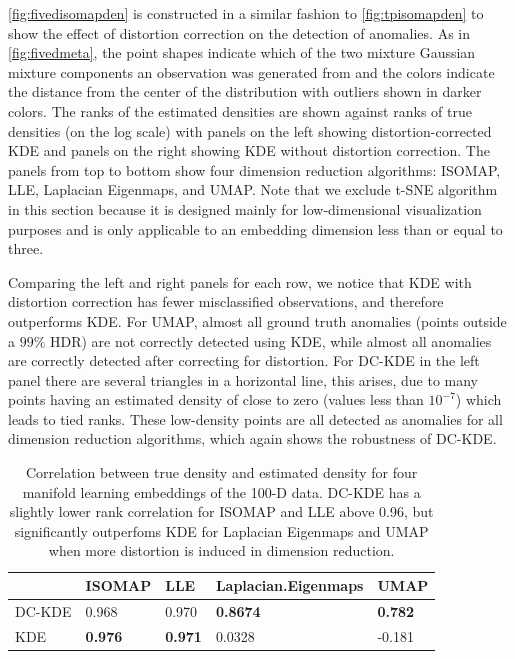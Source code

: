 \documentclass[12pt]{article}
\begin{document}
\autoref{fig:fivedisomapden} is constructed in a similar fashion to \autoref{fig:tpisomapden} to show the effect of distortion correction on the detection of anomalies. As in \autoref{fig:fivedmeta}, the point shapes indicate which of the two mixture Gaussian mixture components an observation was generated from and the colors indicate the distance from the center of the distribution with outliers shown in darker colors. The ranks of the estimated densities are shown against ranks of true densities (on the log scale) with panels on the left showing distortion-corrected KDE and panels on the right showing KDE without distortion correction. The panels from top to bottom show four dimension reduction algorithms: ISOMAP, LLE, Laplacian Eigenmaps, and UMAP. Note that we exclude t-SNE algorithm in this section because it is designed mainly for low-dimensional visualization purposes and is only applicable to an embedding dimension less than or equal to three.

Comparing the left and right panels for each row, we notice that KDE with distortion correction has fewer misclassified observations, and therefore outperforms KDE. For UMAP, almost all ground truth anomalies (points outside a \(99\%\) HDR) are not correctly detected using KDE, while almost all anomalies are correctly detected after correcting for distortion. For DC-KDE in the left panel there are several triangles in a horizontal line, this arises, due to many points having an estimated density of close to zero (values less than \(10^{-7}\)) which leads to tied ranks. These low-density points are all detected as anomalies for all dimension reduction algorithms, which again shows the robustness of DC-KDE.

\begin{table}

\caption{\label{tab:fivedcors}Correlation between true density and estimated density for four manifold learning embeddings of the 100-D data. DC-KDE has a slightly lower rank correlation for ISOMAP and LLE above 0.96, but significantly outperfoms KDE for Laplacian Eigenmaps and UMAP when more distortion is induced in dimension reduction.}
\centering
\begin{tabular}[t]{l>{}l>{}l>{}l>{}l}
\toprule
  & ISOMAP & LLE & Laplacian.Eigenmaps & UMAP\\
\midrule
DC-KDE & 0.968 & 0.970 & \textbf{0.8674} & \textbf{0.782}\\
KDE & \textbf{0.976} & \textbf{0.971} & 0.0328 & -0.181\\
\bottomrule
\end{tabular}
\end{table}
\end{document}
